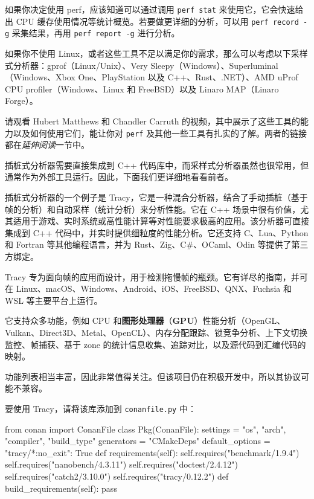 如果你决定使用 perf，应该知道可以通过调用 \texttt{perf stat} 来使用它，它会快速给出 CPU 缓存使用情况等统计概览。若要做更详细的分析，可以用 \texttt{perf record -g} 采集结果，再用 \texttt{perf report -g} 进行分析。

如果你不使用 Linux，或者这些工具不足以满足你的需求，那么可以考虑以下采样式分析器：gprof（Linux/Unix）、Very Sleepy（Windows）、Superluminal（Windows、Xbox One、PlayStation 以及 C++、Rust、.NET）、AMD uProf CPU profiler（Windows、Linux 和 FreeBSD）以及 Linaro MAP（Linaro Forge）。

\label{idx:1195}
请观看 Hubert Matthews 和 Chandler Carruth 的视频，其中展示了这些工具的能力以及如何使用它们，能让你对 \texttt{perf} 及其他一些工具有扎实的了解。两者的链接都在\emph{延伸阅读}一节中。

插桩式分析器需要直接集成到 C++ 代码库中，而采样式分析器虽然也很常用，但通常作为外部工具运行。因此，下面我们更详细地看看前者。

插桩式分析器的一个例子是 Tracy，它是一种混合分析器，结合了手动插桩（基于帧的分析）和自动采样（统计分析）来分析性能。它在 C++ 场景中很有价值，尤其适用于游戏、实时系统或高性能计算等对性能要求极高的应用。该分析器可直接集成到 C++ 代码中，并实时提供细粒度的性能分析。它还支持 C、Lua、Python 和 Fortran 等其他编程语言，并为 Rust、Zig、C\#、OCaml、Odin 等提供了第三方绑定。

Tracy 专为面向帧的应用而设计，用于检测拖慢帧的瓶颈。它有详尽的指南，并可在 Linux、macOS、Windows、Android、iOS、FreeBSD、QNX、Fuchsia 和 WSL 等主要平台上运行。

\label{idx:1196}
它支持众多功能，例如 CPU 和\textbf{图形处理器}（\textbf{GPU}）性能分析（OpenGL、Vulkan、Direct3D、Metal、OpenCL）、内存分配跟踪、锁竞争分析、上下文切换监控、帧捕获、基于 zone 的统计信息收集、追踪对比，以及源代码到汇编代码的映射。

功能列表相当丰富，因此非常值得关注。但该项目仍在积极开发中，所以其协议可能不兼容。

要使用 Tracy，请将该库添加到 \texttt{conanfile.\allowbreak{}py} 中：

\begin{codebox}[python]
from conan import ConanFile
class Pkg(ConanFile):
    settings = "os", "arch", "compiler", "build_type"
    generators = "CMakeDeps"
    default_options = {"tracy/*:no_exit": True}
    def requirements(self):
        self.requires("benchmark/1.9.4")
        self.requires("nanobench/4.3.11")
        self.requires("doctest/2.4.12")
        self.requires("catch2/3.10.0")
        self.requires("tracy/0.12.2")
    def build_requirements(self):
        pass
\end{codebox}

